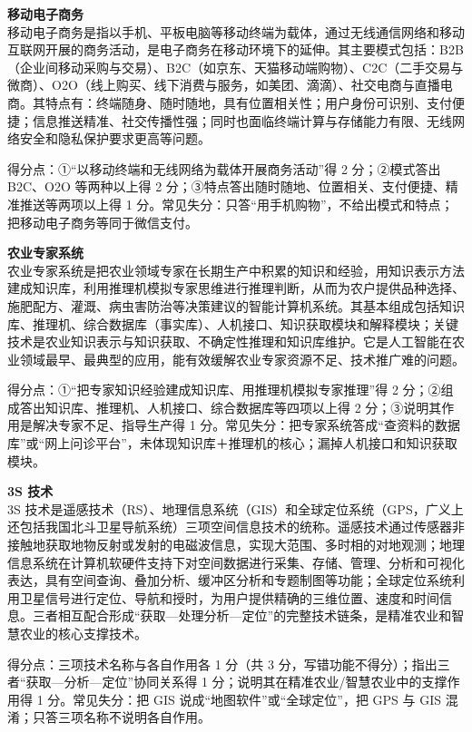 \documentclass[a4paper,11pt]{article}
\begin{document}
\q \textbf{移动电子商务}\\
移动电子商务是指以手机、平板电脑等移动终端为载体，通过无线通信网络和移动互联网开展的商务活动，是电子商务在移动环境下的延伸。其主要模式包括：B2B（企业间移动采购与交易）、B2C（如京东、天猫移动端购物）、C2C（二手交易与微商）、O2O（线上购买、线下消费与服务，如美团、滴滴）、社交电商与直播电商。其特点有：终端随身、随时随地，具有位置相关性；用户身份可识别、支付便捷；信息推送精准、社交传播性强；同时也面临终端计算与存储能力有限、无线网络安全和隐私保护要求更高等问题。
\begin{analysis}得分点：①“以移动终端和无线网络为载体开展商务活动”得 2 分；②模式答出 B2C、O2O 等两种以上得 2 分；③特点答出随时随地、位置相关、支付便捷、精准推送等两项以上得 1 分。常见失分：只答“用手机购物”，不给出模式和特点；把移动电子商务等同于微信支付。\end{analysis}

\q \textbf{农业专家系统}\\
农业专家系统是把农业领域专家在长期生产中积累的知识和经验，用知识表示方法建成知识库，利用推理机模拟专家思维进行推理判断，从而为农户提供品种选择、施肥配方、灌溉、病虫害防治等决策建议的智能计算机系统。其基本组成包括知识库、推理机、综合数据库（事实库）、人机接口、知识获取模块和解释模块；关键技术是农业知识表示与知识获取、不确定性推理和知识库维护。它是人工智能在农业领域最早、最典型的应用，能有效缓解农业专家资源不足、技术推广难的问题。
\begin{analysis}得分点：①“把专家知识经验建成知识库、用推理机模拟专家推理”得 2 分；②组成答出知识库、推理机、人机接口、综合数据库等四项以上得 2 分；③说明其作用是解决专家不足、指导生产得 1 分。常见失分：把专家系统答成“查资料的数据库”或“网上问诊平台”，未体现知识库＋推理机的核心；漏掉人机接口和知识获取模块。\end{analysis}

\q \textbf{3S 技术}\\
3S 技术是遥感技术（RS）、地理信息系统（GIS）和全球定位系统（GPS，广义上还包括我国北斗卫星导航系统）三项空间信息技术的统称。遥感技术通过传感器非接触地获取地物反射或发射的电磁波信息，实现大范围、多时相的对地观测；地理信息系统在计算机软硬件支持下对空间数据进行采集、存储、管理、分析和可视化表达，具有空间查询、叠加分析、缓冲区分析和专题制图等功能；全球定位系统利用卫星信号进行定位、导航和授时，为用户提供精确的三维位置、速度和时间信息。三者相互配合形成“获取—处理分析—定位”的完整技术链条，是精准农业和智慧农业的核心支撑技术。
\begin{analysis}得分点：三项技术名称与各自作用各 1 分（共 3 分，写错功能不得分）；指出三者“获取—分析—定位”协同关系得 1 分；说明其在精准农业/智慧农业中的支撑作用得 1 分。常见失分：把 GIS 说成“地图软件”或“全球定位”，把 GPS 与 GIS 混淆；只答三项名称不说明各自作用。\end{analysis}
\end{document}

